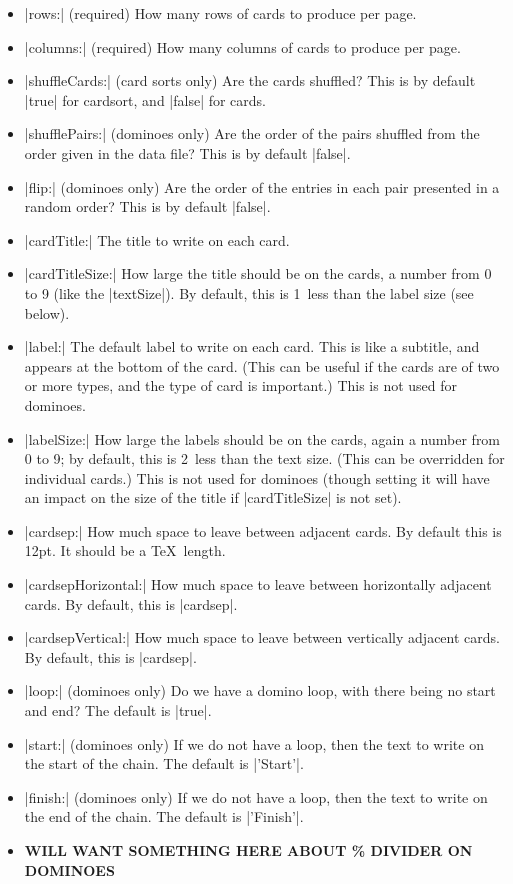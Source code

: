 \documentclass{article}
\begin{document}
\begin{itemize}
\item |rows:| (required) How many rows of cards to produce per
  page.
\item |columns:| (required) How many columns of cards to produce
  per page.
\item |shuffleCards:| (card sorts only) Are the cards shuffled?
  This is by default |true| for cardsort, and |false| for
  cards.
\item |shufflePairs:| (dominoes only) Are the order of the pairs
  shuffled from the order given in the data file?  This is by default
  |false|.
\item |flip:| (dominoes only) Are the order of the entries in
  each pair presented in a random order?  This is by default
  |false|.
\item |cardTitle:| The title to write on each card.
\item |cardTitleSize:| How large the title should be on the
  cards, a number from 0 to 9 (like the |textSize|).  By default,
  this is 1~less than the label size (see below).
\item |label:| The default label to write on each card.  This is
  like a subtitle, and appears at the bottom of the card.  (This can
  be useful if the cards are of two or more types, and the type of
  card is important.)  This is not used for dominoes.
\item |labelSize:| How large the labels should be on the cards,
  again a number from 0 to 9; by default, this is 2~less than the text
  size.  (This can be overridden for individual cards.)  This is not
  used for dominoes (though setting it will have an impact on the size
  of the title if |cardTitleSize| is not set).
\item |cardsep:| How much space to leave between
  adjacent cards.  By default this is 12pt.  It should be a \TeX\
  length.
\item |cardsepHorizontal:| How much space to leave between
  horizontally adjacent cards.  By default, this is |cardsep|.
\item |cardsepVertical:| How much space to leave between
  vertically adjacent cards.  By default, this is |cardsep|.
\item |loop:| (dominoes only) Do we have a domino loop, with
  there being no start and end?  The default is |true|.
\item |start:| (dominoes only) If we do not have a loop, then the
  text to write on the start of the chain.  The default is |'Start'|.
\item |finish:| (dominoes only) If we do not have a loop, then the
  text to write on the end of the chain.  The default is |'Finish'|.
\item \textbf{WILL WANT SOMETHING HERE ABOUT \% DIVIDER ON DOMINOES}
\end{itemize}
\end{document}
